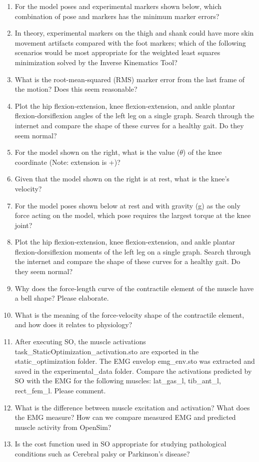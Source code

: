 \documentclass[11pt]{article}
\begin{document}
\begin{enumerate}
    \item For the model poses and experimental markers shown below, which combination of pose and markers has the minimum marker errors?
    \item In theory, experimental markers on the thigh and shank could have more skin movement artifacts compared with the foot markers; which of the following scenarios would be most appropriate for the weighted least squares minimization solved by the Inverse Kinematics Tool?
    \item What is the root-mean-squared (RMS) marker error from the last frame of the motion? Does this seem reasonable?
    \item Plot the hip flexion-extension, knee flexion-extension, and ankle plantar flexion-dorsiflexion angles of the left leg on a single graph. Search through the internet and compare the shape of these curves for a healthy gait. Do they seem normal?
    \item For the model shown on the right, what is the value ($\theta$) of the knee coordinate (Note: extension is +)?
    \item Given that the model shown on the right is at rest, what is the knee's velocity?
    \item For the model poses shown below at rest and with gravity (g) as the only force acting on the model, which pose requires the largest torque at the knee joint?
    \item Plot the hip flexion-extension, knee flexion-extension, and ankle plantar flexion-dorsiflexion moments of the left leg on a single graph. Search through the internet and compare the shape of these curves for a healthy gait. Do they seem normal?
    \item Why does the force-length curve of the contractile element of the muscle have a bell shape? Please elaborate. 
    \item What is the meaning of the force-velocity shape of the contractile element, and how does it relates to physiology? 
    \item After executing SO, the muscle activations task\_StaticOptimization\_activation.sto are exported in the static\_optimization folder. The EMG envelop emg\_env.sto was extracted and saved in the experimental\_data folder. Compare the activations predicted by SO with the EMG for the following muscles: lat\_gas\_l, tib\_ant\_l, rect\_fem\_l. Please comment.
    \item What is the difference between muscle excitation and activation? What does the EMG measure? How can we compare measured EMG and predicted muscle activity from OpenSim?
    \item Is the cost function used in SO appropriate for studying pathological conditions such as Cerebral palsy or Parkinson’s disease?
\end{enumerate}
\end{document}
